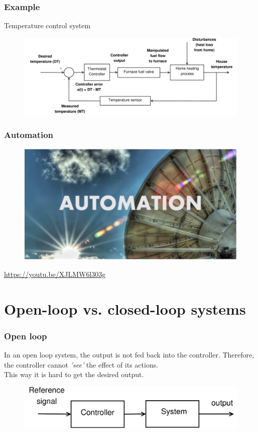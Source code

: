 \begin{frame}
	\frametitle{Example}
	\vspace{-3ex}
	Temperature control system\\
	\bigskip
	\begin{figure}
		\includegraphics[width=1\linewidth]{temp_control_system}
	\end{figure}
\end{frame}


\begin{frame}
	\frametitle{Automation}
	\begin{figure}
		\includegraphics[width=1\linewidth]{automation}
	\end{figure}
	\url{https://youtu.be/XJLMW6l303g}
\end{frame}

\section{Open-loop vs. closed-loop systems} 

\begin{frame}
	\frametitle{Open loop}
	\vspace{-4ex}
	In an open loop system, the output is not fed back into the controller. Therefore, the controller cannot \textit{'see'} the effect of its actions. \\
	This way it is hard to get the desired output.\\
	\bigskip
	\begin{figure}
		\includegraphics[width=1\linewidth]{open_loop}
	\end{figure}
\end{frame}

